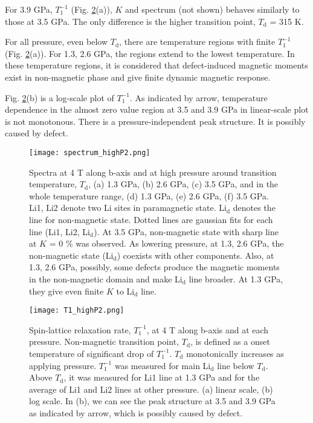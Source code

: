For 3.9 GPa, $T^{-1}_1$ (Fig. \ref{T1_highP}(a)), $K$ and spectrum (not shown) behaves similarly to those at 3.5 GPa.
The only difference is the higher transition point, $T_{\mathrm{d}}$ = 315 K.

For all pressure, even below $T_{\mathrm{d}}$, there are temperature regions with finite $T^{-1}_1$ (Fig. \ref{T1_highP}(a)).
For 1.3, 2.6 GPa, the regions extend to the lowest temperature.
In these temperature regions, it is considered that defect-induced magnetic moments exist in non-magnetic phase and give finite dynamic magnetic response.

Fig. \ref{T1_highP}(b) is a log-scale plot of $T^{-1}_1$.
As indicated by arrow, temperature dependence in the almost zero value region at 3.5 and 3.9 GPa in linear-scale plot is not monotonous.
There is a pressure-independent peak structure.
It is possibly caused by defect.

\begin{figure}[H]
  \centering
  \texttt{[image: spectrum\_highP2.png]}
  \caption{Spectra at 4 T along b-axis and at high pressure around transition temperature, $T_\mathrm{d}$, (a) 1.3 GPa, (b) 2.6 GPa, (c) 3.5 GPa,
  and in the whole temperature range, (d) 1.3 GPa, (e) 2.6 GPa, (f) 3.5 GPa.
  Li1, Li2 denote two Li sites in paramagnetic state.
  Li$_\mathrm{d}$ denotes the line for non-magnetic state.
  Dotted lines are gaussian fits for each line (Li1, Li2, Li$_\mathrm{d}$).
  At 3.5 GPa, non-magnetic state with sharp line at $K$ = 0 \% was observed.
  As lowering pressure, at 1.3, 2.6 GPa, the non-magnetic state (Li$_\mathrm{d}$) coexists with other components.
  Also, at 1.3, 2.6 GPa, possibly, some defects produce the magnetic moments in the non-magnetic domain and make Li$_\mathrm{d}$ line broader.
  At 1.3 GPa, they give even finite $K$ to Li$_\mathrm{d}$ line.}
  \label{spectrum_highP}
\end{figure}

\begin{figure}[H]
  \centering
  \texttt{[image: T1\_highP2.png]}
  \caption{Spin-lattice relaxation rate, $T^{-1}_1$, at 4 T along b-axis and at each pressure.
  Non-magnetic transition point, $T_\mathrm{d}$, is defined as a onset temperature of significant drop of $T^{-1}_1$.
  $T_\mathrm{d}$ monotonically increases as applying pressure.
  $T^{-1}_1$ was measured for main Li$_\mathrm{d}$ line below $T_\mathrm{d}$.
  Above $T_\mathrm{d}$, it was measured for Li1 line at 1.3 GPa and for the average of Li1 and Li2 lines at other pressure.
  (a) linear scale, (b) log scale.
  In (b), we can see the peak structure at 3.5 and 3.9 GPa as indicated by arrow, which is possibly caused by defect.}
  \label{T1_highP}
\end{figure}

